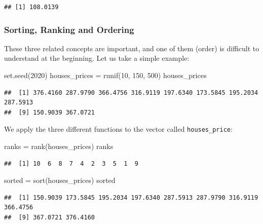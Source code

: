\documentclass[
]{book}
\newenvironment{Shaded}{\begin{snugshade}}{\end{snugshade}}
\newcommand{\DecValTok}[1]{\textcolor[rgb]{0.00,0.00,0.81}{#1}}
\newcommand{\FunctionTok}[1]{\textcolor[rgb]{0.00,0.00,0.00}{#1}}
\newcommand{\NormalTok}[1]{#1}
\newcommand{\OtherTok}[1]{\textcolor[rgb]{0.56,0.35,0.01}{#1}}
\begin{document}
\begin{verbatim}
## [1] 108.0139
\end{verbatim}

\hypertarget{sorting-ranking-and-ordering}{%
\subsubsection{Sorting, Ranking and Ordering}\label{sorting-ranking-and-ordering}}

These three related concepts are important, and one of them (order) is difficult to understand at the beginning. Let us take a simple example:

\begin{Shaded}
\begin{Highlighting}[]
\FunctionTok{set.seed}\NormalTok{(}\DecValTok{2020}\NormalTok{)}
\NormalTok{houses\_prices }\OtherTok{=} \FunctionTok{runif}\NormalTok{(}\DecValTok{10}\NormalTok{, }\DecValTok{150}\NormalTok{, }\DecValTok{500}\NormalTok{)}
\NormalTok{houses\_prices}
\end{Highlighting}
\end{Shaded}

\begin{verbatim}
##  [1] 376.4160 287.9790 366.4756 316.9119 197.6340 173.5845 195.2034 287.5913
##  [9] 150.9039 367.0721
\end{verbatim}

We apply the three different functions to the vector called \texttt{houses\_price}:

\begin{Shaded}
\begin{Highlighting}[]
\NormalTok{ranks }\OtherTok{=} \FunctionTok{rank}\NormalTok{(houses\_prices)}
\NormalTok{ranks}
\end{Highlighting}
\end{Shaded}

\begin{verbatim}
##  [1] 10  6  8  7  4  2  3  5  1  9
\end{verbatim}

\begin{Shaded}
\begin{Highlighting}[]
\NormalTok{sorted }\OtherTok{=} \FunctionTok{sort}\NormalTok{(houses\_prices)}
\NormalTok{sorted}
\end{Highlighting}
\end{Shaded}

\begin{verbatim}
##  [1] 150.9039 173.5845 195.2034 197.6340 287.5913 287.9790 316.9119 366.4756
##  [9] 367.0721 376.4160
\end{verbatim}
\end{document}
